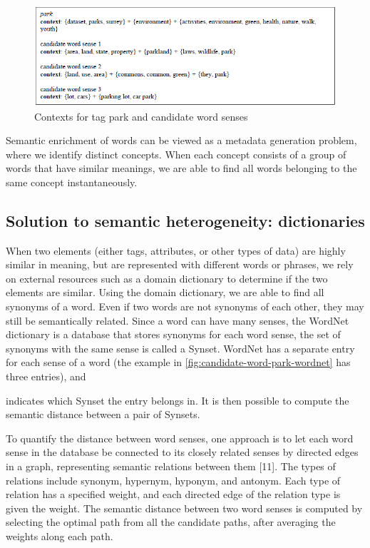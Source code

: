 \begin{figure}
    \centering
    \includegraphics[width=5in]{figures/contexts-park-candidate.png}
    \caption{Contexts for tag park and candidate word senses}
    \label{fig:contexts-park-candidate}
\end{figure}

Semantic enrichment of words can be viewed as a metadata generation problem, where we identify distinct concepts. When each concept consists of a group of words that have similar meanings, we are able to find all words belonging to the same concept instantaneously.

\subsection{Solution to semantic heterogeneity: dictionaries}
\label{ssec:SolutionToSemanticHeterogeneityDdictionaries}

When two elements (either tags, attributes, or other types of data) are highly similar in meaning, but are represented with different words or phrases, we rely on external resources such as a domain dictionary to determine if the two elements are similar. Using the domain dictionary, we are able to find all synonyms of a word. Even if two words are not synonyms of each other, they may still be semantically related.
Since a word can have many senses, the WordNet dictionary is a database that stores synonyms for each word sense, the set of synonyms with the same sense is called a Synset. WordNet has a separate entry for each sense of a word (the example in \autoref{fig:candidate-word-park-wordnet} has three entries), and

indicates which Synset the entry belongs in. It is then possible to compute the semantic distance between a pair of Synsets.

To quantify the distance between word senses, one approach is to let each word sense in the database be connected to its closely related senses by directed edges in a graph, representing semantic relations between them \cite{cruz2005role}[11]. The types of relations include synonym, hypernym, hyponym, and antonym. Each type of relation has a specified weight, and each directed edge of the relation type is given the weight. The semantic distance between two word senses is computed by selecting the optimal path from all the candidate paths, after averaging the weights along each path.

